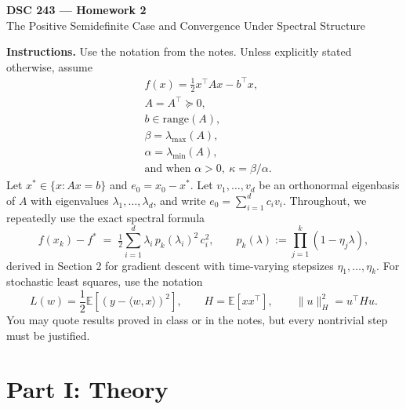 \documentclass[11pt]{article}
\newcommand{\bstar}{f^\ast}
\newcommand{\xstar}{x^\ast}
\newcommand{\E}{\mathbb{E}}
\begin{document}
\begin{center}
{\Large \textbf{DSC 243 --- Homework 2}} \\
\vspace{0.5em}
{\large The Positive Semidefinite Case and Convergence Under Spectral Structure}
\end{center}

\textbf{Instructions.}
Use the notation from the notes. Unless explicitly stated otherwise, assume
\begin{align*}
&f(x) = \tfrac{1}{2} x^\top A x - b^\top x,\\
&A = A^\top \succeq 0,\\
&b \in \mathrm{range}(A),\\
&\beta = \lambda_{\max}(A),\\
&\alpha = \lambda_{\min}(A),\\
&\text{and when } \alpha > 0,\ \kappa = \beta/\alpha.
\end{align*}
Let $\xstar\in\{x:Ax=b\}$ and $e_0 = x_0 - \xstar$. Let $v_1,\dots,v_d$ be an orthonormal eigenbasis of $A$ with eigenvalues $\lambda_1,\dots,\lambda_d$, and write $e_0 = \sum_{i=1}^d c_i v_i$. Throughout, we repeatedly use the exact spectral formula
\[
f(x_k) - \bstar \;=\; \tfrac{1}{2}\sum_{i=1}^{d}\lambda_i\,p_k(\lambda_i)^2\,c_i^2, \qquad p_k(\lambda) := \prod_{j=1}^{k}(1-\eta_j\lambda),
\]
derived in Section 2 for gradient descent with time-varying stepsizes $\eta_1,\dots,\eta_k$. For stochastic least squares, use the notation
\[
L(w)=\frac12\E[(y-\langle w,x\rangle)^2],\qquad H=\E[xx^\top],\qquad \|u\|_H^2=u^\top H u.
\]
You may quote results proved in class or in the notes, but every nontrivial step must be justified.

\section*{Part I: Theory}
\end{document}
